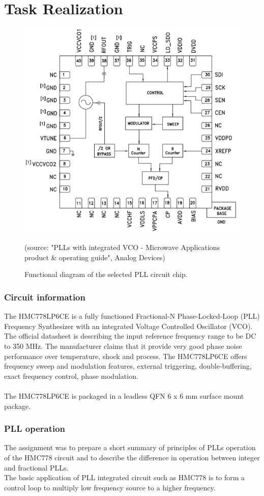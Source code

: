 \documentclass[eng,printmode]{mgr}
\begin{document}
\section{Task Realization}
\begin{figure}[!h]
	\centering
	\includegraphics[width=0.5\linewidth]{pll}
	\label{fig:pll}
	\caption{Functional diagram of the selected PLL circuit chip.}
	(source: "PLLs with integrated VCO - Microwave Applications
	product \& operating guide", Analog Devices)
\end{figure}
\noindent
\subsubsection{Circuit information}
The HMC778LP6CE is a fully functioned Fractional-N Phase-Locked-Loop (PLL) Frequency Synthesizer with an
integrated Voltage Controlled Oscillator (VCO). \\
The official datasheet is describing the input reference frequency range to be DC to 350 MHz. The manufacturer claims that it provide very good phase noise performance over temperature,
shock and process. The HMC778LP6CE offers frequency sweep and modulation features, external triggering, double-buffering, exact frequency control, phase modulation.\\ \\ The HMC778LP6CE is packaged
in a leadless QFN 6 x 6 mm surface mount package.

\subsubsection{PLL operation}
The assignment was to prepare a short summary of principles of PLLs operation of the HMC778 circuit and to describe the difference in operation between integer and fractional PLLs.
\\
The basic application of PLL integrated circuit such as HMC778 is to form a control loop to multiply low frequency source to a higher frequency.
\end{document}
